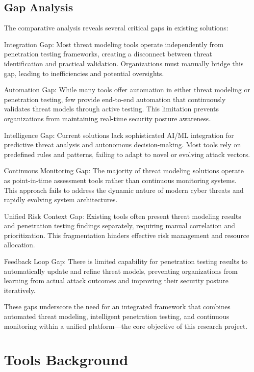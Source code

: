\subsection{Gap Analysis}

The comparative analysis reveals several critical gaps in existing solutions:

Integration Gap: Most threat modeling tools operate independently from penetration testing frameworks, creating a disconnect between threat identification and practical validation. Organizations must manually bridge this gap, leading to inefficiencies and potential oversights.

Automation Gap: While many tools offer automation in either threat modeling or penetration testing, few provide end-to-end automation that continuously validates threat models through active testing. This limitation prevents organizations from maintaining real-time security posture awareness.

Intelligence Gap: Current solutions lack sophisticated AI/ML integration for predictive threat analysis and autonomous decision-making. Most tools rely on predefined rules and patterns, failing to adapt to novel or evolving attack vectors.

Continuous Monitoring Gap: The majority of threat modeling solutions operate as point-in-time assessment tools rather than continuous monitoring systems. This approach fails to address the dynamic nature of modern cyber threats and rapidly evolving system architectures.

Unified Risk Context Gap: Existing tools often present threat modeling results and penetration testing findings separately, requiring manual correlation and prioritization. This fragmentation hinders effective risk management and resource allocation.

Feedback Loop Gap: There is limited capability for penetration testing results to automatically update and refine threat models, preventing organizations from learning from actual attack outcomes and improving their security posture iteratively.

These gaps underscore the need for an integrated framework that combines automated threat modeling, intelligent penetration testing, and continuous monitoring within a unified platform---the core objective of this research project.

\section{Tools Background}

